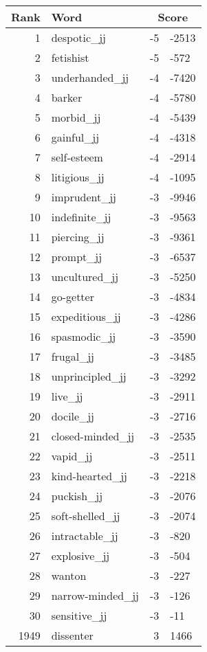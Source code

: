 \begin{longtable}[!htbp]{| rlr@{.}l |}
    \hline
    \textbf{Rank} & \textbf{Word} & \multicolumn{2}{c|}{\textbf{Score}} \\
    \hline
    \endhead
    1 & despotic\_jj & -5 & -2513 \\
    2 & fetishist & -5 & -572 \\
    3 & underhanded\_jj & -4 & -7420 \\
    4 & barker & -4 & -5780 \\
    5 & morbid\_jj & -4 & -5439 \\
    6 & gainful\_jj & -4 & -4318 \\
    7 & self-esteem & -4 & -2914 \\
    8 & litigious\_jj & -4 & -1095 \\
    9 & imprudent\_jj & -3 & -9946 \\
    10 & indefinite\_jj & -3 & -9563 \\
    11 & piercing\_jj & -3 & -9361 \\
    12 & prompt\_jj & -3 & -6537 \\
    13 & uncultured\_jj & -3 & -5250 \\
    14 & go-getter & -3 & -4834 \\
    15 & expeditious\_jj & -3 & -4286 \\
    16 & spasmodic\_jj & -3 & -3590 \\
    17 & frugal\_jj & -3 & -3485 \\
    18 & unprincipled\_jj & -3 & -3292 \\
    19 & live\_jj & -3 & -2911 \\
    20 & docile\_jj & -3 & -2716 \\
    21 & closed-minded\_jj & -3 & -2535 \\
    22 & vapid\_jj & -3 & -2511 \\
    23 & kind-hearted\_jj & -3 & -2218 \\
    24 & puckish\_jj & -3 & -2076 \\
    25 & soft-shelled\_jj & -3 & -2074 \\
    26 & intractable\_jj & -3 & -820 \\
    27 & explosive\_jj & -3 & -504 \\
    28 & wanton & -3 & -227 \\
    29 & narrow-minded\_jj & -3 & -126 \\
    30 & sensitive\_jj & -3 & -11 \\
    1949 & dissenter & 3 & 1466 \\

\end{longtable}
